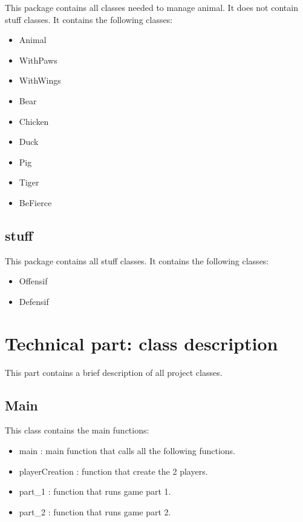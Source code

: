 This package contains all classes needed to manage animal. It does not contain stuff classes. It contains the following classes:
\begin{itemize}
 \item Animal
 \item WithPaws
 \item WithWings
 \item Bear
 \item Chicken
 \item Duck
 \item Pig
 \item Tiger
 \item BeFierce
\end{itemize}

\subsection{stuff}

This package contains all stuff classes. It contains the following classes:
\begin{itemize}
 \item Offensif
 \item Defensif
\end{itemize}






\section{Technical part: class description}

This part contains a brief description of all project classes.

\subsection{Main}

This class contains the main functions:

\begin{itemize}
 \item main : main function that calls all the following functions.
 \item playerCreation : function that create the 2 players.
 \item part\_1 : function that runs game part 1.
 \item part\_2 : function that runs game part 2.
\end{itemize}


